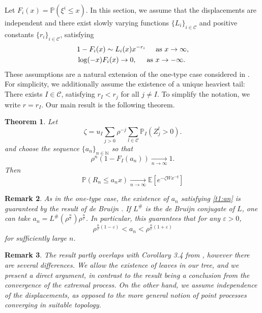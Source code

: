 \documentclass[12pt]{article}
\numberwithin{equation}{section}
\newtheorem{theorem}{Theorem}[section]
\newtheorem{remark}[theorem]{Remark}
\newcommand{\E}{\mathbb{E}}
\newcommand{\N}{\mathbb{N}}
\begin{document}
Let $F_i(x) = \mathbb{P}\left(\xi^i \leq x\right)$. In this section, we assume that the displacements are independent and there exist slowly varying functions $\{L_i\}_{i \in \mathcal{C}}$ and positive constants $\{r_i\}_{i \in \mathcal{C}}$, satisfying
\begin{align}\label{tails1}
\begin{aligned}
     &1-F_i(x) \sim L_i(x) x^{-r_i} \hspace{0.5cm} \text{as }x \rightarrow \infty, \\
     &\log(-x)F_i(x)\rightarrow 0 , \hspace{0.5cm}  \text{as }x \rightarrow -\infty.
\end{aligned}
\end{align}
 These assumptions are a natural extension of the one-type case considered in \cite{Durrett1983}. For simplicity, we additionally assume the existence of a unique heaviest tail: There exists $I \in \mathcal{C}$, satisfying $r_I < r_j$ for all $j\neq I$. To simplify the notation, we write $r=r_I$. Our main result is the following theorem.

 
\begin{theorem}\label{t1} Let \[\zeta =u_I\sum_{j>0} \rho^{-j} \sum_{l \in \mathcal{C}}    \mathbb{P}_I\left(Z_j^l> 0\right).\] and choose the sequence $\{a_n\}_{n \in \N}$ so that 
\begin{equation}\label{t1:an}
    \rho^n \left(1-F_I(a_n)\right) \xrightarrow[ n \rightarrow \infty]{} 1.
\end{equation}
Then
\[
\mathbb{P} ( R_n \leq a_n x)  \xrightarrow[ n \rightarrow \infty]{} \E[e^{-\zeta Wx^{-q}}]
\]
\end{theorem}

\begin{remark}\label{t1:remark}\emph{
    As in the one-type case, the existence of $a_n$ satisfying \eqref{t1:an} is guaranteed by the result of de Bruijn \cite{DeBruijn}. If $L^\#$ is the de Bruijn conjugate of $L$, one can take $a_n = L^\#\left(\rho^{\frac n {r}}\right) \rho^{\frac n {r}}$. In particular, this guarantees that for any $\varepsilon > 0$, \begin{equation}
        \rho^{\frac n r (1-\varepsilon)} < a_n < \rho^{\frac n r (1+\varepsilon)}
    \end{equation}
    for sufficiently large $n$.
}\end{remark}
 



 \begin{remark} \emph{The result partly overlaps with Corollary 3.4 from \cite{Palmowski}, however there are several differences. We allow the existence of leaves in our tree, and we present a direct argument, in contrast to the result being a conclusion from the convergence of the extremal process. On the other hand, we assume independence of the displacements, as opposed to the more general notion of point processes converging in suitable topology.
}\end{remark}
\end{document}
